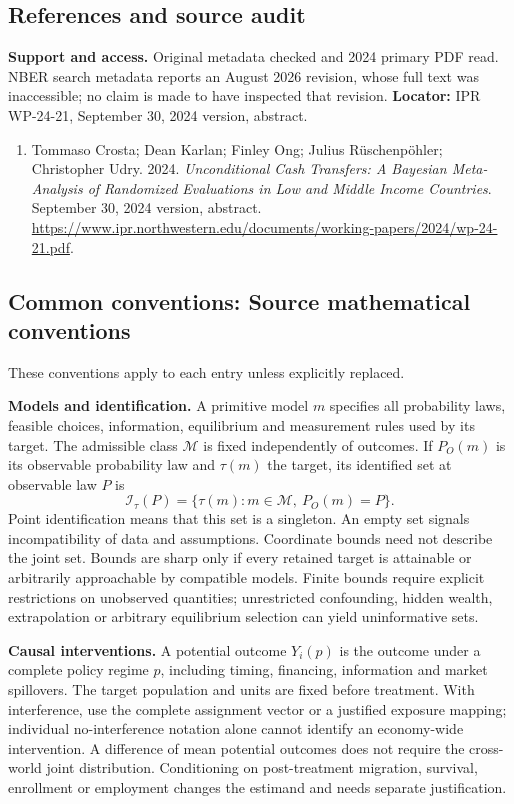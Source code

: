 \documentclass[11pt,a4paper]{article}
\begin{document}
\subsection*{References and source audit}
\textbf{Support and access.} Original metadata checked and 2024 primary PDF read. NBER search metadata reports an August 2026 revision, whose full text was inaccessible; no claim is made to have inspected that revision. \textbf{Locator:} IPR WP-24-21, September 30, 2024 version, abstract.
\begin{enumerate}\raggedright
\item\hypertarget{definitions:source:30007654:1}{} Tommaso Crosta; Dean Karlan; Finley Ong; Julius R\"{u}schenpöhler; Christopher Udry. 2024. \emph{Unconditional Cash Transfers: A Bayesian Meta-Analysis of Randomized Evaluations in Low and Middle Income Countries}. September 30, 2024 version, abstract.
\url{https://www.ipr.northwestern.edu/documents/working-papers/2024/wp-24-21.pdf}.
\end{enumerate}

\subsection*{Common conventions: Source mathematical conventions}

These conventions apply to each entry unless explicitly replaced.

\textbf{Models and identification.} A primitive model \(m\) specifies all probability laws, feasible choices, information, equilibrium and measurement rules used by its target. The admissible class \(\mathcal M\) is fixed independently of outcomes. If \(P_O(m)\) is its observable probability law and \(\tau(m)\) the target, its identified set at observable law \(P\) is
\[
 \mathcal I_\tau(P)=\{\tau(m):m\in\mathcal M,\ P_O(m)=P\}.
\]
Point identification means that this set is a singleton. An empty set signals incompatibility of data and assumptions. Coordinate bounds need not describe the joint set. Bounds are sharp only if every retained target is attainable or arbitrarily approachable by compatible models. Finite bounds require explicit restrictions on unobserved quantities; unrestricted confounding, hidden wealth, extrapolation or arbitrary equilibrium selection can yield uninformative sets.

\textbf{Causal interventions.} A potential outcome \(Y_i(p)\) is the outcome under a complete policy regime \(p\), including timing, financing, information and market spillovers. The target population and units are fixed before treatment. With interference, use the complete assignment vector or a justified exposure mapping; individual no-interference notation alone cannot identify an economy-wide intervention. A difference of mean potential outcomes does not require the cross-world joint distribution. Conditioning on post-treatment migration, survival, enrollment or employment changes the estimand and needs separate justification.
\end{document}
